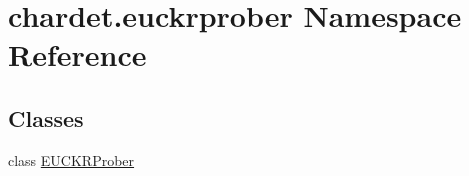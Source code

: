 \hypertarget{namespacechardet_1_1euckrprober}{}\section{chardet.\+euckrprober Namespace Reference}
\label{namespacechardet_1_1euckrprober}
\subsection*{Classes}
\begin{DoxyCompactItemize}
\item 
class \hyperlink{classchardet_1_1euckrprober_1_1_e_u_c_k_r_prober}{E\+U\+C\+K\+R\+Prober}
\end{DoxyCompactItemize}
